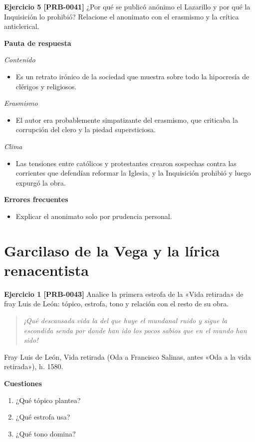 \documentclass{book}
\begin{document}
\noindent\textbf{Ejercicio 5 [PRB-0041]}
¿Por qué se publicó anónimo el Lazarillo y por qué la Inquisición lo prohibió? Relacione el anonimato con el erasmismo y la crítica anticlerical.


\noindent\textbf{Pauta de respuesta}

\noindent\textit{Contenido}
\begin{itemize}
\item Es un retrato irónico de la sociedad que muestra sobre todo la hipocresía de clérigos y religiosos.
\end{itemize}

\noindent\textit{Erasmismo}
\begin{itemize}
\item El autor era probablemente simpatizante del erasmismo, que criticaba la corrupción del clero y la piedad supersticiosa.
\end{itemize}

\noindent\textit{Clima}
\begin{itemize}
\item Las tensiones entre católicos y protestantes crearon sospechas contra las corrientes que defendían reformar la Iglesia, y la Inquisición prohibió y luego expurgó la obra.
\end{itemize}

\noindent\textbf{Errores frecuentes}
\begin{itemize}
\item Explicar el anonimato solo por prudencia personal.
\end{itemize}

\section{Garcilaso de la Vega y la lírica renacentista}

\noindent\textbf{Ejercicio 1 [PRB-0043]}
Analice la primera estrofa de la «Vida retirada» de fray Luis de León: tópico, estrofa, tono y relación con el resto de su obra.


\begin{quote}
\itshape ¡Qué descansada vida la del que huye el mundanal ruido y sigue la escondida senda por donde han ido los pocos sabios que en el mundo han sido!
\end{quote}
{\noindent\footnotesize Fray Luis de León, Vida retirada (Oda a Francisco Salinas, antes «Oda a la vida retirada»), h. 1580.\par}

\noindent\textbf{Cuestiones}
\begin{enumerate}
\item ¿Qué tópico plantea?
\item ¿Qué estrofa usa?
\item ¿Qué tono domina?
\end{enumerate}
\end{document}
